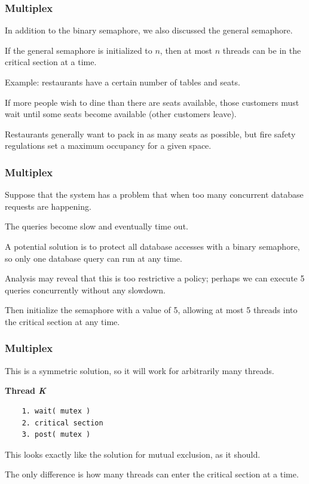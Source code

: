\begin{frame}
	\frametitle{Multiplex}
	In addition to the binary semaphore, we also discussed the general semaphore.

	If the general semaphore is initialized to $n$, then at most $n$ threads can be in the critical section at a time.

	Example: restaurants have a certain number of tables and seats.

	If more people wish to dine than there are seats available, those customers must wait until some seats become available (other customers leave).

	Restaurants generally want to pack in as many seats as possible, but fire safety regulations set a maximum occupancy for a given space.

\end{frame}

\begin{frame}
	\frametitle{Multiplex}

	Suppose that the system has a problem that when too many concurrent database requests are happening.

	The queries become slow and eventually time out.

	A potential solution is to protect all database accesses with a binary semaphore, so only one database query can run at any time.

	Analysis may reveal that this is too restrictive a policy; perhaps we can execute 5 queries concurrently without any slowdown.

	Then initialize the semaphore with a value of 5, allowing at most 5 threads into the critical section at any time.


\end{frame}

\begin{frame}[fragile]
	\frametitle{Multiplex}


	This is a symmetric solution, so it will work for arbitrarily many threads.

	\textbf{Thread \textit{K}}\vspace{-6em}
	\begin{verbatim}
	1. wait( mutex )
	2. critical section
	3. post( mutex )
  \end{verbatim}
	\vspace{-2em}

	This looks exactly like the solution for mutual exclusion, as it should.

	The only difference is how many threads can enter the critical section at a time.



\end{frame}


